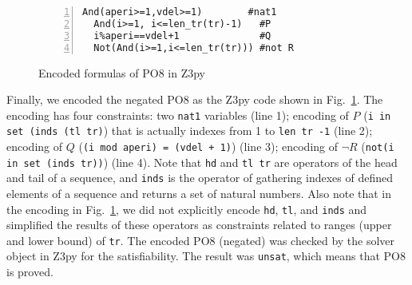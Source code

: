 \begin{figure}[t]
\begin{center}
\begin{mdframed}[roundcorner=5pt,shadow=true]
\begin{Verbatim}[fontsize=\small,numbers=left]
  And(aperi>=1,vdel>=1)        #nat1
  And(i>=1, i<=len_tr(tr)-1)   #P
  i%aperi==vdel+1              #Q
  Not(And(i>=1,i<=len_tr(tr))) #not R
\end{Verbatim}
\end{mdframed}
\vspace{-10pt}
\caption{Encoded formulas of PO8 in Z3py}
\label{fig:po8_encoded_case1}
\end{center}
\end{figure}

Finally, we encoded the negated PO8 as the Z3py code shown in Fig.~\ref{fig:po8_encoded_case1}. The encoding has four constraints: two {\tt nat1} variables (line 1); encoding of $P$ ({\tt i in set (inds (tl tr)}) that is actually indexes from 1 to {\tt len tr -1} (line 2); encoding of $Q$ ({\tt (i mod aperi) = (vdel + 1)}) (line 3); encoding of $\neg R$ ({\tt not(i in set (inds tr))}) (line 4). Note that {\tt hd} and {\tt tl tr} are operators of the head and tail of a sequence, and {\tt inds} is the operator of gathering indexes of defined elements of a sequence and returns a set of natural numbers. Also note that in the encoding in Fig.~\ref{fig:po8_encoded_case1}, we did not explicitly encode {\tt hd}, {\tt tl}, and {\tt inds} and simplified the results of these operators as constraints related to ranges (upper and lower bound) of {\tt tr}. The encoded PO8 (negated) was checked by the solver object in Z3py for the satisfiability. The result was {\tt unsat}, which means that PO8 is proved.





